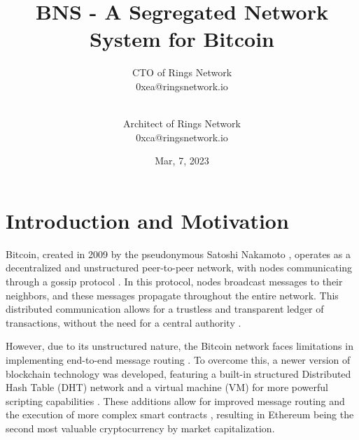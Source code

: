 \documentclass[twocolumn]{article}
\date{Mar, 7, 2023}
\author{
  CTO of Rings Network \\ 0xea@ringsnetwork.io \\ \\
  \and
  Architect of Rings Network \\ 0xca@ringsnetwork.io
}
\title{BNS - A Segregated Network System for Bitcoin}
\begin{document}

\section{Introduction and Motivation}

Bitcoin, created in 2009 by the pseudonymous Satoshi Nakamoto \cite{nakamoto2008bitcoin}, operates as a decentralized and unstructured peer-to-peer network, with nodes communicating through a gossip protocol \cite{bano2017consensus}. In this protocol, nodes broadcast messages to their neighbors, and these messages propagate throughout the entire network. This distributed communication allows for a trustless and transparent ledger of transactions, without the need for a central authority \cite{antonopoulos2014mastering}.

However, due to its unstructured nature, the Bitcoin network faces limitations in implementing end-to-end message routing \cite{bano2017consensus}. To overcome this, a newer version of blockchain technology was developed, featuring a built-in structured Distributed Hash Table (DHT) network and a virtual machine (VM) for more powerful scripting capabilities \cite{wood2014ethereum}. These additions allow for improved message routing and the execution of more complex smart contracts \cite{buterin2014ethereum}, resulting in Ethereum being the second most valuable cryptocurrency by market capitalization.
\end{document}
